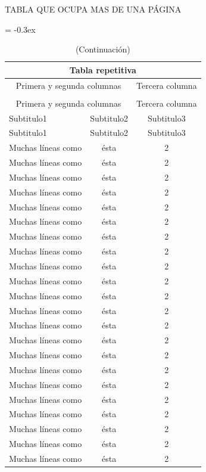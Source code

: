 TABLA QUE OCUPA MAS DE UNA PÁGINA

{\extrarowheight = -0.3ex
\renewcommand{\arraystretch}{1.8}
\begin{longtable}{p{2in}cc}
\caption{Un ejemplo sencillo}\\
\hline\hline
\multicolumn{3}{c}{\textbf{Tabla repetitiva}}\\
\hline\hline
\multicolumn{2}{c}{Primera y segunda columnas} & {Tercera columna}\\
\hline
\endfirsthead
\caption[]{(Continuación)}\\
\hline
\multicolumn{2}{c}{Primera y segunda columnas} & {Tercera columna}\\
\hline
Subtitulo1 & Subtitulo2 & Subtitulo3 \\
\hline
\endhead
\hline
\endfoot
\hline
\endlastfoot
Subtitulo1 & Subtitulo2 & Subtitulo3 \\
\hline\hline
Muchas líneas como & ésta & 2 \\
Muchas líneas como & ésta & 2 \\
Muchas líneas como & ésta & 2 \\
Muchas líneas como & ésta & 2 \\
Muchas líneas como & ésta & 2 \\
Muchas líneas como & ésta & 2 \\
Muchas líneas como & ésta & 2 \\
Muchas líneas como & ésta & 2 \\
Muchas líneas como & ésta & 2 \\
Muchas líneas como & ésta & 2 \\
Muchas líneas como & ésta & 2 \\
Muchas líneas como & ésta & 2 \\
Muchas líneas como & ésta & 2 \\
Muchas líneas como & ésta & 2 \\
Muchas líneas como & ésta & 2 \\
Muchas líneas como & ésta & 2 \\
Muchas líneas como & ésta & 2 \\
Muchas líneas como & ésta & 2 \\
Muchas líneas como & ésta & 2 \\
Muchas líneas como & ésta & 2 \\
Muchas líneas como & ésta & 2 \\
Muchas líneas como & ésta & 2 \\

\end{longtable}}
